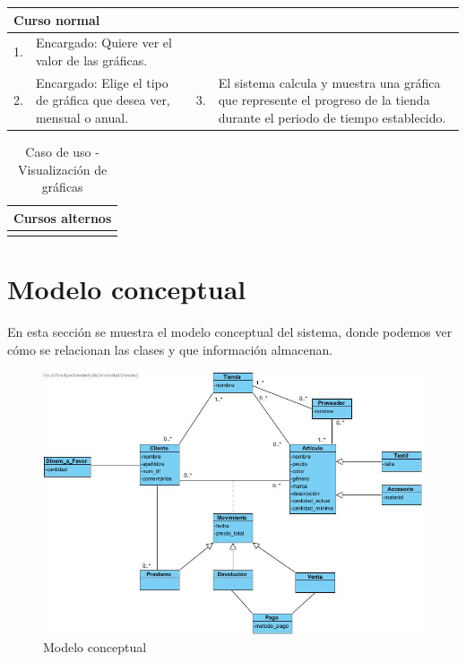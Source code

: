 \begin{table}[H]
	\centering
	\begin{tabular}{| m{} | m{} | m{} | m{} |}
		\hline
		\multicolumn{4}{|m{0.9\textwidth}|}{Curso normal}     \\ 
		\hline
		1. & Encargado: Quiere ver el valor de las gráficas. &  & \\ 
		\hline
		2. & Encargado: Elige el tipo de gráfica que desea ver, mensual o anual. & 3. & El sistema calcula y muestra una gráfica que represente el progreso de la tienda durante el periodo de tiempo establecido.  \\ 
		\hline
	\end{tabular}
\end{table}

\begin{table}[H]
	\centering
	\begin{tabular}{| m{} | m{} | m{} | m{} |}
		\hline
		\multicolumn{4}{|m{0.9\textwidth}|}{Cursos alternos}     \\ 
		\hline
		& \multicolumn{3}{m{0.67\textwidth}|}{} \\ 
		\hline
	\end{tabular}
	\caption{Caso de uso - Visualización de gráficas}
\end{table}

\newpage


\section{Modelo conceptual}

En esta sección se muestra el modelo conceptual del sistema, donde podemos ver cómo se relacionan las clases y que información almacenan. 

\begin{figure}[H]
	\centering
	\includegraphics[width=1\textwidth]{imagenes/imagenesDiagramas/modelo_conceptual.jpg}
	\caption{Modelo conceptual}
	\label{fig:modelo_conceptual}
\end{figure}

